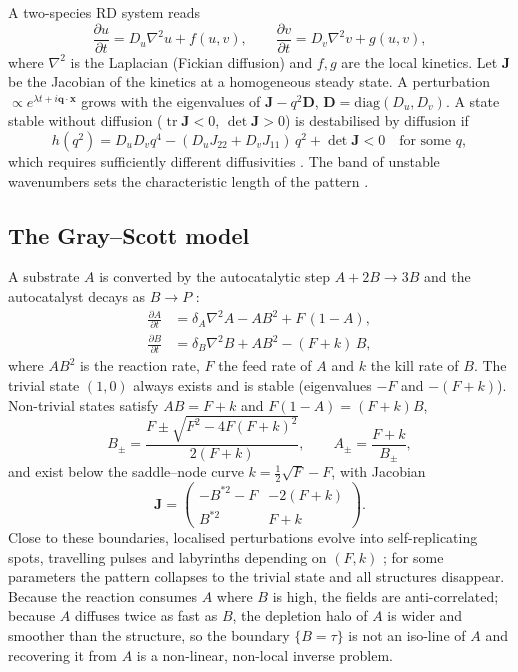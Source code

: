 \documentclass[preprint,12pt,authoryear]{elsarticle}
\newcommand{\dA}{\delta_A}
\newcommand{\dB}{\delta_B}
\begin{document}
A two-species RD system reads
\begin{equation}
\frac{\partial u}{\partial t} = D_u \nabla^2 u + f(u,v), \qquad
\frac{\partial v}{\partial t} = D_v \nabla^2 v + g(u,v),
\end{equation}
where $\nabla^2$ is the Laplacian (Fickian diffusion) and $f,g$ are the local kinetics. Let $\mathbf{J}$ be the Jacobian of the kinetics at a homogeneous steady state. A perturbation $\propto e^{\lambda t + i\mathbf{q}\cdot\mathbf{x}}$ grows with the eigenvalues of $\mathbf{J}-q^2\mathbf{D}$, $\mathbf{D}=\mathrm{diag}(D_u,D_v)$. A state stable without diffusion ($\operatorname{tr}\mathbf{J}<0$, $\det\mathbf{J}>0$) is destabilised by diffusion if
\begin{equation}
h(q^2)=D_uD_v q^4-(D_u J_{22} + D_v J_{11})\,q^2+\det\mathbf{J} < 0 \quad\text{for some } q,
\end{equation}
which requires sufficiently different diffusivities \citep{turing1952}. The band of unstable wavenumbers sets the characteristic length of the pattern \citep{murray2003}.

\subsection{The Gray--Scott model}

A substrate $A$ is converted by the autocatalytic step $A+2B\rightarrow3B$ and the autocatalyst decays as $B\rightarrow P$ \citep{gray1983,gray1984}:
\begin{align}
\frac{\partial A}{\partial t} &= \dA\nabla^2 A - A B^2 + F\,(1-A), \label{eq:gsA}\\
\frac{\partial B}{\partial t} &= \dB\nabla^2 B + A B^2 - (F+k)\,B, \label{eq:gsB}
\end{align}
where $AB^2$ is the reaction rate, $F$ the feed rate of $A$ and $k$ the kill rate of $B$. The trivial state $(1,0)$ always exists and is stable (eigenvalues $-F$ and $-(F+k)$). Non-trivial states satisfy $AB=F+k$ and $F(1-A)=(F+k)B$,
\begin{equation}
B_\pm=\frac{F\pm\sqrt{F^2-4F(F+k)^2}}{2(F+k)},\qquad A_\pm=\frac{F+k}{B_\pm},
\end{equation}
and exist below the saddle--node curve $k=\tfrac12\sqrt{F}-F$, with Jacobian
\begin{equation}
\mathbf{J}=\begin{pmatrix} -B^{*2}-F & -2(F+k)\\ B^{*2} & F+k\end{pmatrix}.
\end{equation}
Close to these boundaries, localised perturbations evolve into self-replicating spots, travelling pulses and labyrinths depending on $(F,k)$ \citep{pearson1993}; for some parameters the pattern collapses to the trivial state and all structures disappear. Because the reaction consumes $A$ where $B$ is high, the fields are anti-correlated; because $A$ diffuses twice as fast as $B$, the depletion halo of $A$ is wider and smoother than the structure, so the boundary $\{B=\tau\}$ is not an iso-line of $A$ and recovering it from $A$ is a non-linear, non-local inverse problem.
\end{document}

